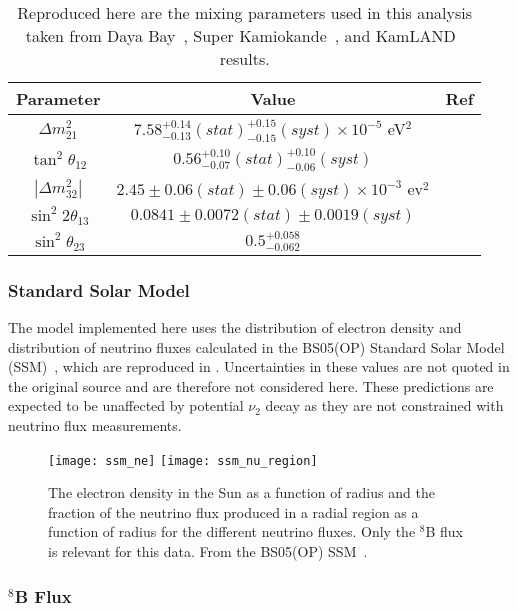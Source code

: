 \begin{table}
\centering
\begin{tabular}{c|c|c}
Parameter & Value & Ref \\ \hline
$ \Delta m ^2 _{21} $ & $7.58^{+0.14}_{-0.13}(stat)^{+0.15}_{-0.15}(syst) \times 10^{-5}$ eV$^2$ & \cite{kamland} \\ \hline
$ \tan^2 \theta_{12} $ & $0.56^{+0.10}_{-0.07}(stat)^{+0.10}_{-0.06}(syst) $ & \cite{kamland} \\ \hline
$ |\Delta m ^2 _{32}| $ & $2.45\pm0.06(stat)\pm0.06(syst) \times 10^{-3}$ ev$^2$ & \cite{dayabay} \\ \hline
$ \sin^2 2\theta_{13} $ & $0.0841\pm0.0072(stat)\pm0.0019(syst)$ & \cite{dayabay} \\ \hline
$ \sin^2 \theta_{23} $ & $0.5^{+0.058}_{-0.062}$ & \cite{superkth23} \\ 
\end{tabular}
\caption{
\label{tbl:mixing_params}
Reproduced here are the mixing parameters used in this analysis taken from Daya Bay~\cite{dayabay}, Super Kamiokande~\cite{superkth23}, and KamLAND~\cite{kamland} results.
}
\end{table}

\subsubsection{Standard Solar Model}

The model implemented here uses the distribution of electron density and distribution of neutrino fluxes calculated in the BS05(OP) Standard Solar Model (SSM)~\cite{bs05op}, which are reproduced in . 
Uncertainties in these values are not quoted in the original source and are therefore not considered here.
These predictions are expected to be unaffected by potential $\nu_2$ decay as they are not constrained with neutrino flux measurements.

\begin{figure}
\centering
\texttt{[image: ssm\_ne]}
\texttt{[image: ssm\_nu\_region]}
\caption{
The electron density in the Sun as a function of radius and the fraction of the neutrino flux produced in a radial region as a function of radius for the different neutrino fluxes. Only the $^8$B flux is relevant for this data. From the BS05(OP) SSM~\cite{bs05op}.
}
\label{fig:ssm}
\end{figure}

\subsubsection{$^8$B Flux}

